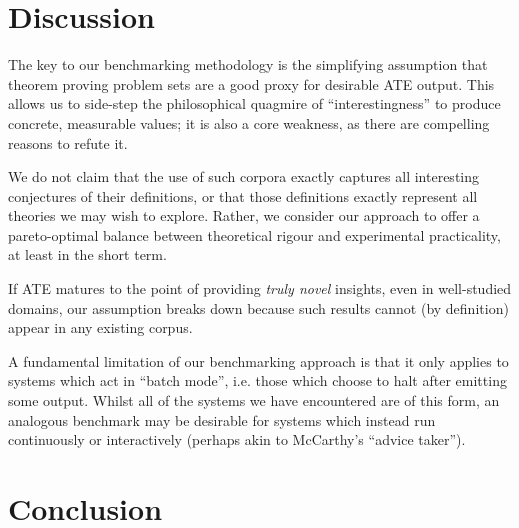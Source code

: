 
\section{Discussion}
\label{sec:discussion}

The key to our benchmarking methodology is the simplifying assumption that
theorem proving problem sets are a good proxy for desirable ATE output. This
allows us to side-step the philosophical quagmire of ``interestingness'' to
produce concrete, measurable values; it is also a core weakness, as there are
compelling reasons to refute it.

We do not claim that the use of such corpora exactly captures all interesting
conjectures of their definitions, or that those definitions exactly represent
all theories we may wish to explore. Rather, we consider our approach to offer a
pareto-optimal balance between theoretical rigour and experimental practicality,
at least in the short term.

If ATE matures to the point of providing \emph{truly novel} insights, even in
well-studied domains, our assumption breaks down because such results cannot (by
definition) appear in any existing corpus.

A fundamental limitation of our benchmarking approach is that it only applies to
systems which act in ``batch mode'', i.e. those which choose to halt after
emitting some output. Whilst all of the systems we have encountered are of this
form, an analogous benchmark may be desirable for systems which instead run
continuously or interactively (perhaps akin to McCarthy's ``advice taker'').%






\section{Conclusion}
\label{sec:conclusion}

